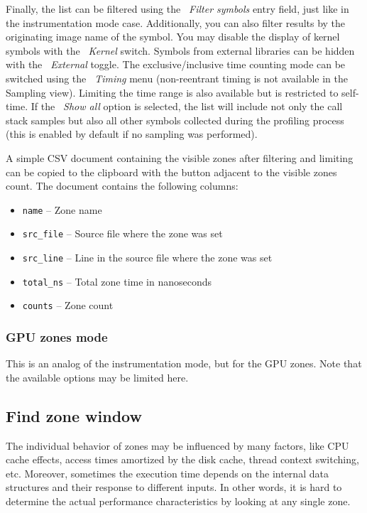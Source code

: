 \documentclass[hidelinks,titlepage,a4paper,twoside]{article}
\begin{document}
Finally, the list can be filtered using the \emph{\faFilter{}~Filter symbols} entry field, just like in the instrumentation mode case. Additionally, you can also filter results by the originating image name of the symbol. You may disable the display of kernel symbols with the \emph{\faHatWizard{}~Kernel} switch. Symbols from external libraries can be hidden with the \emph{\faShield*{}~External} toggle. The exclusive/inclusive time counting mode can be switched using the \emph{~Timing} menu (non-reentrant timing is not available in the Sampling view). Limiting the time range is also available but is restricted to self-time. If the \emph{\faPuzzlePiece{}~Show all} option is selected, the list will include not only the call stack samples but also all other symbols collected during the profiling process (this is enabled by default if no sampling was performed).

A simple CSV document containing the visible zones after filtering and limiting can be copied to the clipboard with the button adjacent to the visible zones count. The document contains the following columns:

\begin{itemize}
  \item \texttt{name} -- Zone name
  \item \texttt{src\_file} -- Source file where the zone was set
  \item \texttt{src\_line} -- Line in the source file where the zone was set
  \item \texttt{total\_ns} -- Total zone time in nanoseconds
  \item \texttt{counts} -- Zone count
\end{itemize}

\subsubsection{GPU zones mode}

This is an analog of the instrumentation mode, but for the GPU zones. Note that the available options may be limited here.

\subsection{Find zone window}
\label{findzone}

The individual behavior of zones may be influenced by many factors, like CPU cache effects, access times amortized by the disk cache, thread context switching, etc. Moreover, sometimes the execution time depends on the internal data structures and their response to different inputs. In other words, it is hard to determine the actual performance characteristics by looking at any single zone.
\end{document}
